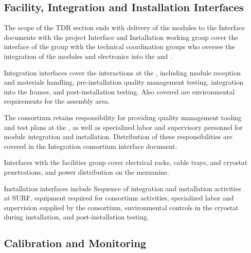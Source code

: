 
\subsection{Facility, Integration and Installation Interfaces}

The scope of the  TDR section ends with delivery of the modules to the  Interface documents with the project Interface and Installation working group cover the interface of the  group with the technical coordination groups who oversee the integration of the  modules and electronics into the  and .  

Integration interfaces cover the interactions at the , including  module reception and materials handling, pre-installation quality management testing, integration into the  frames, and post-installation testing.  Also covered are environmental requirements for the assembly area.

The  consortium retains responsibility for providing quality management tooling and test plans at the , as well as specialized labor and supervisory personnel for  module integration and installation. Distribution of these responsibilities are covered in the Integration  consortium interface document.

Interfaces with the facilities group cover electrical racks, cable trays, and cryostat penetrations, and power distribution on the mezzanine.

Installation interfaces include Sequence of integration and installation activities at SURF, equipment required for  consortium activities, specialized labor and supervision supplied by the  consortium, environmental controls in the cryostat during installation, and post-installation testing.









\subsection{Calibration and Monitoring}
\label{sec:fdsp-pd-intfc-calib}

